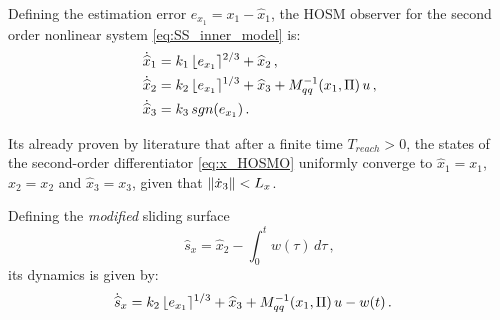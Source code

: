 Defining the estimation error $e_{x_1} = x_1 - \hat{x}_1$, the HOSM observer for the second order nonlinear system \eqref{eq:SS_inner_model} is:
%
\begin{align}
\dot{\widehat{x}}_1 &= k_1 \, \lfloor e_{x_1} \rceil^{2/3} + \widehat{x}_2 \,, \nonumber \\
\dot{\widehat{x}}_2 &= k_2 \, \lfloor e_{x_1} \rceil^{1/3} + \widehat{x}_3 + M^{-1}_{qq}(x_1,\Pi) \, u \,, \nonumber \\
\dot{\widehat{x}}_3 &= k_3 \, sgn(e_{x_1}) \,.
\label{eq:x_HOSMO}
\end{align}

%
%
Its already proven by literature \cite{Angulo2013} that after a finite time $T_{reach}>0$, the states of the second-order differentiator \eqref{eq:x_HOSMO} uniformly converge to $\widehat{x}_1 = x_1$, $\widehat{x}_2 = x_2$ and $\widehat{x}_3 = x_3$, given that $\left\lVert\dot{x}_3\right\rVert < L_x$.

Defining the {\it modified} sliding surface
%
\begin{equation}
\widehat{s}_x = \widehat{x}_2 - \int^t_0{w(\tau)} \, d\tau \,,
\label{eq:sx_sliding_HOSMO}
\end{equation}
%
its dynamics is given by:
%
\begin{align}
\dot{\widehat{s}}_x &= 
k_2 \, \lfloor e_{x_1} \rceil^{1/3} + \widehat{x}_3 + M^{-1}_{qq}(x_1,\Pi) \, u - w(t) \,.
\label{eq:dsx_sliding_HOSMO}
\end{align}

